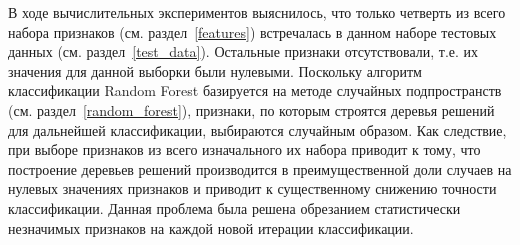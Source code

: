 В ходе вычислительных экспериментов выяснилось, что только четверть из всего набора признаков
(см. раздел~\ref{features}) встречалась в данном наборе тестовых данных (см. раздел~\ref{test_data}). 
Остальные признаки отсутствовали, т.е. их значения для данной выборки были нулевыми. 
Поскольку алгоритм классификации Random Forest базируется на методе случайных подпространств (см. раздел~\ref{random_forest}), признаки, по которым строятся деревья решений для дальнейшей классификации, выбираются случайным образом. Как следствие, при выборе признаков из всего изначального их набора приводит к тому, что построение деревьев решений производится в преимущественной доли случаев на нулевых значениях признаков и приводит к существенному снижению точности классификации. Данная проблема была решена обрезанием статистически незначимых признаков на каждой новой итерации классификации.  


